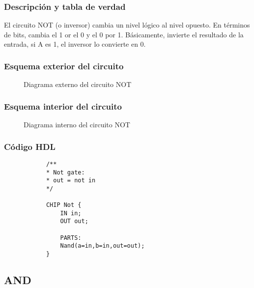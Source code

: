 \documentclass[12pt]{article}
\begin{document}
		\subsubsection{Descripción y tabla de verdad}
		El circuito NOT (o inversor) cambia un nivel lógico al nivel opuesto. En términos de bits, cambia el 1 or el 0 y el 0 por 1.
		Básicamente, invierte el resultado de la entrada, si A es 1, el inversor lo convierte en 0.
		\begin{table}[H]
			\centering
			\caption{Tabla de verdad de NOT}
			\label{tab:not}
		\end{table}
		\subsubsection{Esquema exterior del circuito}
		\begin{figure}[H]
			\centering
			
			\caption{Diagrama externo del circuito NOT} \cite{diagram}
			\label{fig:enter-label}
		\end{figure}
		\subsubsection{Esquema interior del circuito}
		\begin{figure}[H]
			\centering
			
			\caption{Diagrama interno del circuito NOT} \cite{diagram}
			\label{fig:enter-label}
		\end{figure}
		\newpage \subsubsection{Código HDL}
		\begin{lstlisting}
			/**
			* Not gate:
			* out = not in
			*/

			CHIP Not {
				IN in;
				OUT out;

				PARTS:
				Nand(a=in,b=in,out=out);
			}
		\end{lstlisting}
		\newpage
		\subsection{AND}
\end{document}
